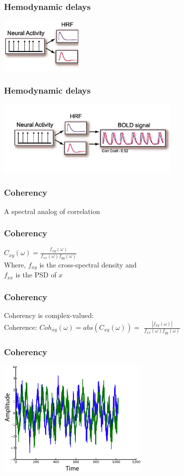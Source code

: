 \documentclass{beamer}
\begin{document}
\begin{frame}
\frametitle{Hemodynamic delays}
\includegraphics[height=2.7cm]{figures/hemo}
\end{frame}

\begin{frame}
\frametitle{Hemodynamic delays}
\includegraphics[height=3.7cm]{figures/tseries_w_hemo}
\end{frame}

\begin{frame}
\frametitle{Coherency}
A spectral analog of correlation
\end{frame}

\begin{frame}
\frametitle{Coherency}
$C_{xy}(\omega) = \frac{f_{xy}(\omega)}{f_{xx}(\omega)f_{yy}(\omega)}$
\pause
\\
\vfill
Where, $f_{xy}$ is the cross-spectral density and 
\\
$f_{xx}$ is the PSD of $x$
\end{frame}

\begin{frame}
\frametitle{Coherency}
Coherency is complex-valued:
\\
\pause
\vfill
Coherence: $Coh_{xy} (\omega) = abs(C_{xy}(\omega)) = $
\pause
$\frac{|f_{xy}(\omega)|}{f_{xx}(\omega)f_{yy}(\omega)}$
\vfill
\end{frame}

\begin{frame}
\frametitle{Coherency}
\includegraphics[height=5.7cm]{figures/outa_phase_tseries}
\end{frame}
\end{document}

